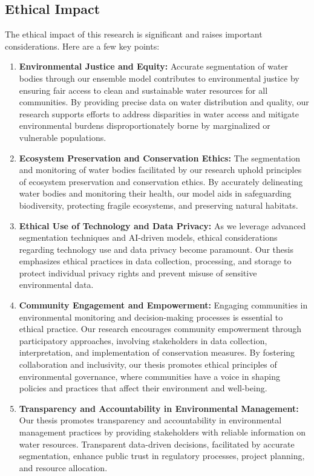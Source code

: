 \subsection{Ethical Impact}
The ethical impact of this research is significant
and raises important considerations. Here are a few key points:

\begin{enumerate}
    \item \textbf{Environmental Justice and Equity: }Accurate segmentation of water bodies through our ensemble model contributes to environmental justice by ensuring fair access to clean and sustainable water resources for all communities. By providing precise data on water distribution and quality, our research supports efforts to address disparities in water access and mitigate environmental burdens disproportionately borne by marginalized or vulnerable populations.
    
    \item \textbf{Ecosystem Preservation and Conservation Ethics: }The segmentation and monitoring of water bodies facilitated by our research uphold principles of ecosystem preservation and conservation ethics. By accurately delineating water bodies and monitoring their health, our model aids in safeguarding biodiversity, protecting fragile ecosystems, and preserving natural habitats.
    
    \item \textbf{Ethical Use of Technology and Data Privacy: }As we leverage advanced segmentation techniques and AI-driven models, ethical considerations regarding technology use and data privacy become paramount. Our thesis emphasizes ethical practices in data collection, processing, and storage to protect individual privacy rights and prevent misuse of sensitive environmental data.
    
    \item \textbf{Community Engagement and Empowerment: }Engaging communities in environmental monitoring and decision-making processes is essential to ethical practice. Our research encourages community empowerment through participatory approaches, involving stakeholders in data collection, interpretation, and implementation of conservation measures. By fostering collaboration and inclusivity, our thesis promotes ethical principles of environmental governance, where communities have a voice in shaping policies and practices that affect their environment and well-being.
    
    \item \textbf{Transparency and Accountability in Environmental Management: }Our thesis promotes transparency and accountability in environmental management practices by providing stakeholders with reliable information on water resources. Transparent data-driven decisions, facilitated by accurate segmentation, enhance public trust in regulatory processes, project planning, and resource allocation.
    
\end{enumerate}



